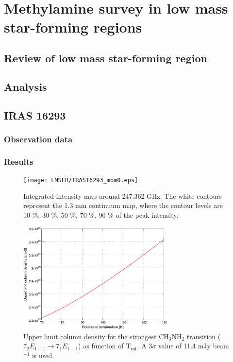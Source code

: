 \chapter{Methylamine survey in low mass star-forming regions
  \label{chap:LMSFRs}}

\section{Review of low mass star-forming region}
\section{Analysis}

\section{IRAS 16293}
\subsection{Observation data}
\subsection{Results}

\begin{figure}[H]
  \centering
  \texttt{[image: LMSFR/IRAS16293\_mom0.eps]}
  \caption{Integrated intensity map around 247.362 GHz. The white contours represent the 1.3 mm continuum map, where the contour levels are 10 \%, 30 \%, 50 \%, 70 \%, 90 \% of the peak intensity.}
  \label{IRAS16293_mom0}
\end{figure}

\begin{figure}[H]
  \centering
  \includegraphics[width=0.7\textwidth]{LMSFR/IRAS16293.eps}
  \caption{Upper limit column density for the strongest CH$_{3}$NH$_{2}$ transition
  ($7_{2}E_{1-1} \rightarrow 7_{1}E_{1-1}$) as function of T$_{\textrm{rot}}$. A 3$\sigma$ value of 
  11.4 mJy beam$^{-1}$ is used.}
  \label{IRAS16293_MA}
\end{figure}


